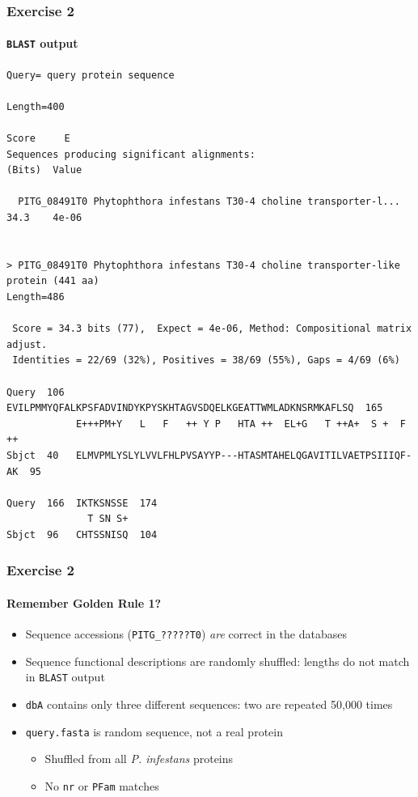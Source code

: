\documentclass[table]{beamer}
\begin{document}
  \begin{frame}[fragile]
    \frametitle{Exercise 2}
    \framesubtitle{\texttt{BLAST} output}
    \begin{tiny}
    \begin{verbatim}
Query= query protein sequence

Length=400
                                                                      Score     E
Sequences producing significant alignments:                          (Bits)  Value

  PITG_08491T0 Phytophthora infestans T30-4 choline transporter-l...  34.3    4e-06


> PITG_08491T0 Phytophthora infestans T30-4 choline transporter-like 
protein (441 aa)
Length=486

 Score = 34.3 bits (77),  Expect = 4e-06, Method: Compositional matrix adjust.
 Identities = 22/69 (32%), Positives = 38/69 (55%), Gaps = 4/69 (6%)

Query  106  EVILPMMYQFALKPSFADVINDYKPYSKHTAGVSDQELKGEATTWMLADKNSRMKAFLSQ  165
            E+++PM+Y   L   F   ++ Y P   HTA ++  EL+G   T ++A+  S +  F ++
Sbjct  40   ELMVPMLYSLYLVVLFHLPVSAYYP---HTASMTAHELQGAVITILVAETPSIIIQF-AK  95

Query  166  IKTKSNSSE  174
              T SN S+
Sbjct  96   CHTSSNISQ  104
    \end{verbatim}   
    \end{tiny} 
\end{frame}

  \begin{frame}
    \frametitle{Exercise 2}
    \framesubtitle{Remember Golden Rule 1?}    
    \begin{itemize}
      \item<1-> Sequence accessions (\texttt{PITG\_?????T0}) \emph{are} correct in the databases
      \item<2-> Sequence functional descriptions are randomly shuffled: lengths do not match in \texttt{BLAST} output
      \item<3-> \texttt{dbA} contains only three different sequences: two are repeated 50,000 times
      \item<4-> \texttt{query.fasta} is random sequence, not a real protein
      \begin{itemize}
        \item<4-> Shuffled from all \textit{P. infestans} proteins
        \item<4-> No \texttt{nr} or \texttt{PFam} matches        
      \end{itemize}
    \end{itemize}
  \end{frame}
\end{document}
